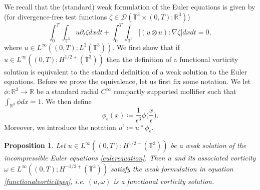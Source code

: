 \documentclass[12pt,a4paper]{article}
\newtheorem{proposition}[theorem]{Proposition}
\theoremstyle{definition}
\theoremstyle{remark}
\numberwithin{equation}{section}
\begin{document}
We recall that the (standard) weak formulation of the Euler equations is given by (for divergence-free test functions $\zeta \in \mathcal{D} (\mathbb{T}^3 \times (0,T);\mathbb{R}^3)$)
\begin{equation} \label{weakformulationeuler}
\int_0^T \int_{\mathbb{T}^3} u \partial_t \zeta dx dt + \int_0^T \int_{\mathbb{T}^3} \big[ (u \otimes u) : \nabla \zeta \big] dx dt = 0,
\end{equation}
where $u \in L^\infty ((0,T); L^2 (\mathbb{T}^3))$. 
We first show that if $u \in L^\infty ((0,T); H^{1/2+} (\mathbb{T}^3))$ then the definition of a functional vorticity solution is equivalent to the standard definition of a weak solution to the Euler equations. Before we prove the equivalence, let us first fix some notation. We let $\phi : \mathbb{R}^3 \rightarrow \mathbb{R}$ be a standard radial $C^\infty$ compactly supported mollifier such that $\int_{\mathbb{R}^3} \phi dx = 1$. We then define
\begin{equation}
\phi_\epsilon (x) \coloneqq \frac{1}{\epsilon^3} \phi \bigg( \frac{x}{\epsilon} \bigg).
\end{equation}
Moreover, we introduce the notation $u^\epsilon \coloneqq u * \phi_\epsilon$. 
\begin{proposition} \label{funcvorticityprop}
Let $u \in L^\infty ((0,T); H^{1/2+} (\mathbb{T}^3))$ be a weak solution of the incompressible Euler equations \eqref{eulerequation}. Then $u$ and its associated vorticity $\omega \in L^\infty ((0,T); H^{-1/2+} (\mathbb{T}^3))$ satisfy the weak formulation in equation \eqref{functionalvorticityeq}, i.e. $(u, \omega)$ is a functional vorticity solution.
\end{proposition}
\end{document}
